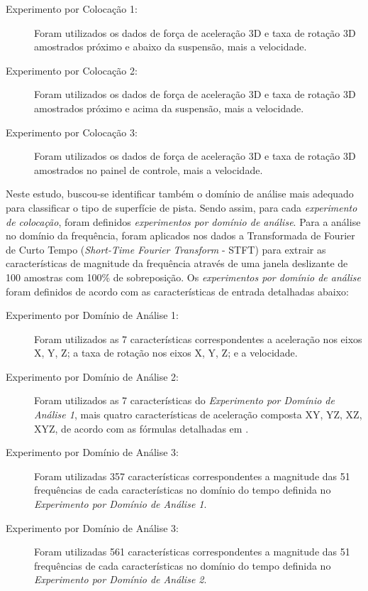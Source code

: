 \begin{description}
	
	\item[Experimento por Colocação 1:] Foram utilizados os dados de força de aceleração 3D e taxa de rotação 3D amostrados próximo e abaixo da suspensão, mais a velocidade.
    
    \item[Experimento por Colocação 2:] Foram utilizados os dados de força de aceleração 3D e taxa de rotação 3D amostrados próximo e acima da suspensão, mais a velocidade.
    
    \item[Experimento por Colocação 3:] Foram utilizados os dados de força de aceleração 3D e taxa de rotação 3D amostrados no painel de controle, mais a velocidade.
    
\end{description}

Neste estudo, buscou-se identificar também o domínio de análise mais adequado para classificar o tipo de superfície de pista. Sendo assim, para cada \emph{experimento de colocação}, foram definidos \emph{experimentos por domínio de análise}. Para a análise no domínio da frequência, foram aplicados nos dados a Transformada de Fourier de Curto Tempo (\textit{Short-Time Fourier Transform} - STFT) para extrair as características de magnitude da frequência através de uma janela deslizante de 100 amostras com 100\% de sobreposição. Os \emph{experimentos por domínio de análise} foram definidos de acordo com as características de entrada detalhadas abaixo:

\begin{description}

    \item[Experimento por Domínio de Análise 1:] Foram utilizados as 7 características correspondentes a aceleração nos eixos X, Y, Z; a taxa de rotação nos eixos X, Y, Z; e a velocidade.
    
    \item[Experimento por Domínio de Análise 2:] Foram utilizados as 7 características do \emph{Experimento por Domínio de Análise 1}, mais quatro características de aceleração composta XY, YZ, XZ, XYZ, de acordo com as fórmulas detalhadas em \cite{Tan2019}.
    
    \item[Experimento por Domínio de Análise 3:] Foram utilizadas 357 características correspondentes a magnitude das 51 frequências de cada características no domínio do tempo definida no \emph{Experimento por Domínio de Análise 1}.
    
    \item[Experimento por Domínio de Análise 3:] Foram utilizadas 561 características correspondentes a magnitude das 51 frequências de cada características no domínio do tempo definida no \emph{Experimento por Domínio de Análise 2}.
    
\end{description}

